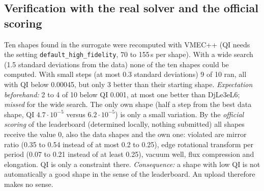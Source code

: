 \subsection*{Verification with the real solver and the official scoring}
Ten shapes found in the surrogate were recomputed with VMEC++ (QI needs the setting \texttt{default\_high\_fidelity}, 70 to 155\,s per shape). With a wide search (1.5 standard deviations from the data) none of the ten shapes could be computed. With small steps (at most 0.3 standard deviations) 9 of 10 ran, all with QI below 0.00045, but only 3 better than their starting shape.
\emph{Expectation beforehand:} 2 to 4 of 10 below QI 0.001, at most one better than DjLe3eL6; \emph{missed} for the wide search. The only own shape (half a step from the best data shape, QI $4.7\cdot10^{-5}$ versus $6.2\cdot10^{-5}$) is only a small variation.
By the \emph{official scoring} of the leaderboard (determined locally, nothing submitted) all shapes receive the value 0, also the data shapes and the own one: violated are mirror ratio (0.35 to 0.54 instead of at most 0.2 to 0.25), edge rotational transform per period (0.07 to 0.21 instead of at least 0.25), vacuum well, flux compression and elongation. QI is only a constraint there.
\emph{Consequence:} a shape with low QI is not automatically a good shape in the sense of the leaderboard. An upload therefore makes no sense.
